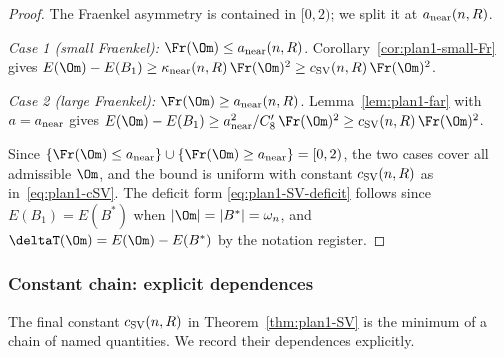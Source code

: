 \begin{proof}
The Fraenkel asymmetry is contained in $[0,2)$; we split it at
$a_{\rm near}(n,R)$.

\emph{Case 1 (small Fraenkel):}
$\Fr(\Om)\le a_{\rm near}(n,R)$. Corollary~\ref{cor:plan1-small-Fr}
gives $E(\Om)-E(B_{1})\ge\kappa_{\rm near}(n,R)\,\Fr(\Om)^{2}\ge c_{\rm SV}(n,R)\,\Fr(\Om)^{2}$.

\emph{Case 2 (large Fraenkel):}
$\Fr(\Om)\ge a_{\rm near}(n,R)$. Lemma~\ref{lem:plan1-far} with
$a=a_{\rm near}$ gives
$E(\Om)-E(B_{1})\ge a_{\rm near}^{2}/C_{8}'\,\Fr(\Om)^{2}\ge c_{\rm SV}(n,R)\,\Fr(\Om)^{2}$.

Since $\{\Fr(\Om)\le a_{\rm near}\}\cup\{\Fr(\Om)\ge a_{\rm near}\}=[0,2)$,
the two cases cover all admissible $\Om$, and the bound is uniform with
constant $c_{\rm SV}(n,R)$ as in~\eqref{eq:plan1-cSV}. The deficit form
\eqref{eq:plan1-SV-deficit} follows since $E(B_{1})=E(B^{*})$ when
$|\Om|=|B^{*}|=\omega_{n}$, and $\deltaT(\Om)=E(\Om)-E(B^{*})$ by the
notation register.
\end{proof}

\subsubsection{Constant chain: explicit dependences}
\label{sec:plan1-constants}

The final constant $c_{\rm SV}(n,R)$ in
Theorem~\ref{thm:plan1-SV} is the minimum of a chain of named
quantities. We record their dependences explicitly.

